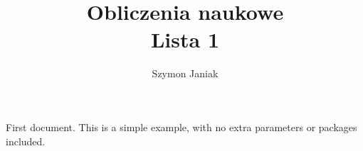 \documentclass{article}
\title{%
	Obliczenia naukowe \\
	\large Lista 1}
\author{Szymon Janiak}
\begin{document}
\maketitle 
First document. This is a simple example, with no 
extra parameters or packages included.
\end{document}
